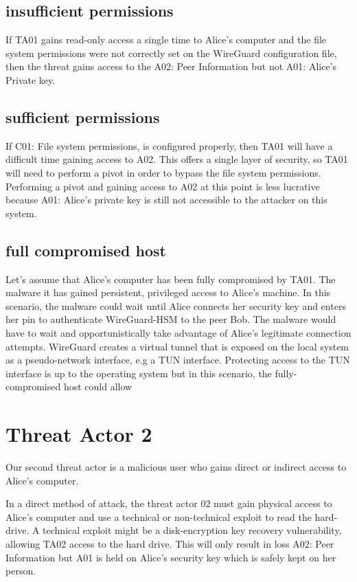 \documentclass [11pt, proquest] {uwthesis}[2020/02/24]
\begin{document}
\subsection{insufficient permissions}
If TA01 gains read-only access a single time to Alice's computer and the file system permissions were not correctly set on the WireGuard configuration file, then the threat gains access to the A02: Peer Information but not A01: Alice's Private key.

\subsection{sufficient permissions}
If C01: File system permissions, is configured properly, then TA01 will have a difficult time gaining access to A02. This offers a single layer of security, so TA01 will need to perform a pivot in order to bypass the file system permissions. Performing a pivot and gaining access to A02 at this point is less lucrative because A01: Alice's private key is still not accessible to the attacker on this system.

\subsection{full compromised host}
Let's assume that Alice's computer has been fully compromised by TA01. The malware it has gained persistent, privileged access to Alice's machine. In this scenario, the malware could wait until Alice connects her security key and enters her pin to authenticate WireGuard-HSM to the peer Bob. The malware would have to wait and opportunistically take advantage of Alice's legitimate connection attempts.
WireGuard creates a virtual tunnel that is exposed on the local system as a pseudo-network interface, e.g a TUN interface. Protecting access to the TUN interface is up to the operating system but in this scenario, the fully-compromised host could allow


\section{Threat Actor 2}
Our second threat actor is a malicious user who gains direct or indirect access to Alice's computer. 

In a direct method of attack, the threat actor 02 must gain physical access to Alice's computer and use a technical or non-technical exploit to read the hard-drive. A technical exploit might be a disk-encryption key recovery vulnerability, allowing TA02 access to the hard drive. This will only result in loss A02: Peer Information but A01 is held on Alice's security key which is safely kept on her person.
\end{document}
